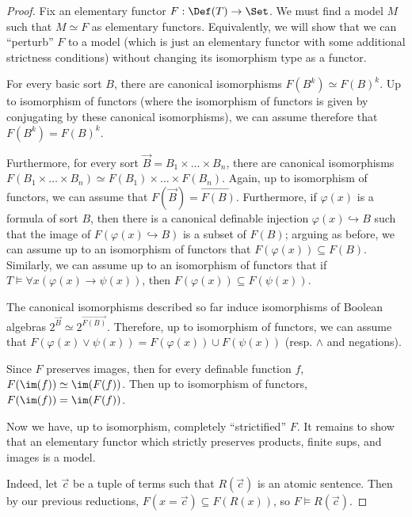 \documentclass[11pt]{article}
\begin{document}

\begin{proof}
  Fix an elementary functor $F : \Def(T) \to \Set$. We must find a model $M$ such that $M \simeq F$ as elementary functors. Equivalently, we will show that we can ``perturb'' $F$ to a model (which is just an elementary functor with some additional strictness conditions) without changing its isomorphism type as a functor.

  For every basic sort $B$, there are canonical isomorphisms $F(B^k) \simeq F(B)^k$. Up to isomorphism of functors (where the isomorphism of functors is given by conjugating by these canonical isomorphisms), we can assume therefore that $F(B^k) = F(B)^k$.

  Furthermore, for every sort $\vec{B} = B_1 \times \dots \times B_n$, there are canonical isomorphisms $F(B_1 \times \dots \times B_n) \simeq F(B_1) \times \dots \times F(B_n)$. Again, up to isomorphism of functors, we can assume that $F(\vec{B}) = \vec{F(B)}$. Furthermore, if $\varphi(x)$ is a formula of sort $B$, then there is a canonical definable injection $\varphi(x) \hookrightarrow B$ such that the image of $F(\varphi(x) \hookrightarrow B)$ is a subset of $F(B)$; arguing as before, we can assume up to an isomorphism of functors that $F(\varphi(x)) \subseteq F(B)$. Similarly, we can assume up to an isomorphism of functors that if $T \models \forall x (\varphi(x) \rightarrow \psi(x))$, then $F(\varphi(x)) \subseteq F(\psi(x))$.

  The canonical isomorphisms described so far induce isomorphisms of Boolean algebras $2^{\vec{B}} \simeq 2^{\vec{F(B)}}$. Therefore, up to isomorphism of functors, we can assume that $F(\varphi(x) \lor \psi(x)) = F(\varphi(x)) \cup F(\psi(x))$ (resp. $\land$ and negations).

  Since $F$ preserves images, then for every definable function $f$, $F(\im(f)) \simeq \im(F(f))$. Then up to isomorphism of functors, $F(\im(f)) = \im(F(f))$.

  Now we have, up to isomorphism, completely ``strictified'' $F$. It remains to show that an elementary functor which strictly preserves products, finite sups, and images is a model.

  Indeed, let $\vec{c}$ be a tuple of terms such that $R(\vec{c})$ is an atomic sentence. Then by our previous reductions, $F(x = \vec{c}) \subseteq F(R(x))$, so $F \models R(\vec{c})$.


\end{proof}
\end{document}

